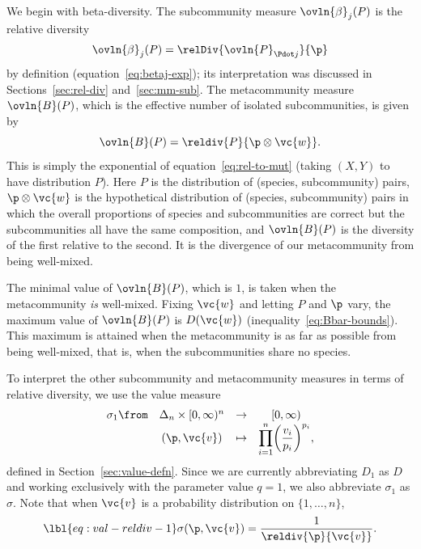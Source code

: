 We begin with beta-diversity.  The subcommunity measure $\ovln{\beta}_j(P)$
is the relative%
%
% 
diversity
\[
\ovln{\beta}_j(P) = \relDiv{\ovln{P}_{\Pdot j}}{\p}
\]
by definition (equation~\eqref{eq:betaj-exp}); its
interpretation was discussed in Sections~\ref{sec:rel-div}
and~\ref{sec:mm-sub}.  The metacommunity measure $\ovln{B}(P)$, which is
the effective number of isolated subcommunities, is given by
% 
\begin{equation*}
\ovln{B}(P) = \reldiv{P}{\p \otimes \vc{w}}.
\end{equation*}
% 
This is simply the exponential of equation~\eqref{eq:rel-to-mut} (taking
$(X, Y)$ to have distribution $P$).  Here $P$ is the distribution of
(species, subcommunity) pairs, $\p \otimes \vc{w}$ is the hypothetical
distribution of (species, subcommunity) pairs in which the overall
proportions of species and subcommunities are correct but the
subcommunities all have the same composition, and $\ovln{B}(P)$ is the
diversity of the first relative to the second.  It is the divergence of our
metacommunity from being well-mixed.  

The minimal value of $\ovln{B}(P)$, which is $1$, is taken when the
metacommunity \emph{is} well-mixed.  Fixing $\vc{w}$ and letting $P$ and
$\p$ vary, the maximum value of $\ovln{B}(P)$ is $D(\vc{w})$
(inequality~\eqref{eq:Bbar-bounds}).  This maximum is attained when the
metacommunity is as far as possible from being well-mixed, that is, when
the subcommunities share no species.

To interpret the other subcommunity and metacommunity measures in terms of
relative diversity, we use the value measure 
\[
\begin{array}{cccc}
\sigma_1\from   &\Delta_n \times [0, \infty)^n  &\to            &
[0, \infty)     \\
                &(\p, \vc{v})                   &\mapsto        &
\displaystyle\prod_{i = 1}^n \biggl( \frac{v_i}{p_i} \biggr)^{p_i},
\end{array}
\]
defined in Section~\ref{sec:value-defn}.  Since we are currently
abbreviating $D_1$ as $D$ and working exclusively with the parameter value
$q = 1$, we also abbreviate $\sigma_1$ as $\sigma$.
Note that when $\vc{v}$ is a probability distribution on $\{1, \ldots,
n\}$,
% 
\begin{equation}
\lbl{eq:val-reldiv-1}
\index{value!relative diversity@and relative diversity}
\sigma(\p, \vc{v}) = \frac{1}{\reldiv{\p}{\vc{v}}}.
\end{equation}

